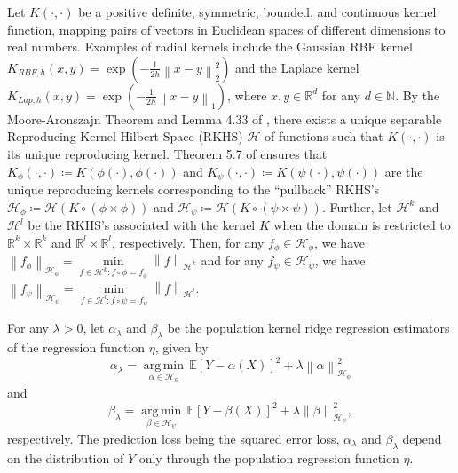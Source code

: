 \documentclass{article}
\theoremstyle{plain}
\newcommand{\R}{\mathbb{R}}
\newcommand{\E}{\mathbb{E}}
\newcommand{\N}{\mathbb{N}}
\newcommand{\Hil}{\mathcal{H}}
\newcommand{\repone}{\phi}
\newcommand{\reptwo}{\psi}
\newcommand{\Hone}{\mathcal{H}_{\phi}}
\newcommand{\Htwo}{\mathcal{H}_{\psi}}
\newcommand{\norm}[1]{\left\|#1\right\|}
\DeclareMathOperator*{\argmin}{arg\,min}
\begin{document}
Let $K(\cdot,\cdot)$ be a positive definite, symmetric, bounded, and continuous kernel function, mapping pairs of vectors in Euclidean spaces of different dimensions to real numbers. Examples of radial kernels include the Gaussian RBF kernel $K_{RBF,h}(x,y) = \exp(-\frac{1}{2h}\norm{x-y}_{2}^{2})$ and the Laplace kernel $K_{Lap,h}(x,y) = \exp(-\frac{1}{2h}\norm{x-y}_{1})$, where $x,y\in \R^{d}$ for any $d\in \N$. By the Moore-Aronszajn Theorem \citep{aronszajn1950theory} and Lemma 4.33 of \citet{steinwart2008support}, there exists a unique separable Reproducing Kernel Hilbert Space (RKHS) $\Hil$ of functions such that $K(\cdot,\cdot)$ is its unique reproducing kernel. Theorem 5.7 of \citet{paulsen2016introduction}
ensures that $K_{\repone}(\cdot,\cdot) \coloneq K(\repone(\cdot),\repone(\cdot))$ and $K_{\reptwo}(\cdot,\cdot) \coloneq K(\reptwo(\cdot),\reptwo(\cdot))$ are the unique reproducing kernels corresponding to the ``pullback'' RKHS's $\Hone \coloneq \Hil\left(K \circ \left(\repone \times \repone\right)\right)$ and $\Htwo \coloneq \Hil\left(K \circ \left(\reptwo \times \reptwo\right)\right)$. Further, let $\Hil^{k}$ and $\Hil^{l}$ be the RKHS's associated with the kernel $K$ when the domain is restricted to $\R^{k} \times \R^{k}$ and $\R^{l} \times \R^{l}$, respectively. Then, for any $f_{\repone} \in \Hone$, we have $\norm{f_{\repone}}_{\Hone}=\underset{f \in \Hil^{k}: f \circ \repone = f_{\repone}}{\min}\norm{f}_{\Hil^{k}}$ and for any $f_{\reptwo} \in \Htwo$, we have $\norm{f_{\reptwo}}_{\Htwo}=\underset{f \in \Hil^{l}: f \circ \reptwo = f_{\reptwo}}{\min}\norm{f}_{\Hil^{l}}$. 

For any $\lambda>0$, let $\alpha_{\lambda}$ and $\beta_{\lambda}$ be the population kernel ridge regression estimators of the regression function $\eta$, given by
\begin{equation}\label{Defintion of alpha}
    \alpha_{\lambda} = \underset{\alpha \in \Hone}{\argmin} \hspace{2pt} \E\left[Y-\alpha(X)\right]^{2} + \lambda \norm{\alpha}_{\Hone}^{2}
\end{equation}
and
\begin{equation}\label{Defintion of beta}
\beta_{\lambda} = \underset{\beta \in \Htwo}{\argmin} \hspace{2pt} \E\left[Y-\beta(X)\right]^{2} + \lambda \norm{\beta}_{\Htwo}^{2},
\end{equation}
respectively. The prediction loss being the squared error loss, $\alpha_{\lambda}$ and $\beta_{\lambda}$ depend on the distribution of $Y$ only through the population regression function $\eta$.
\end{document}

